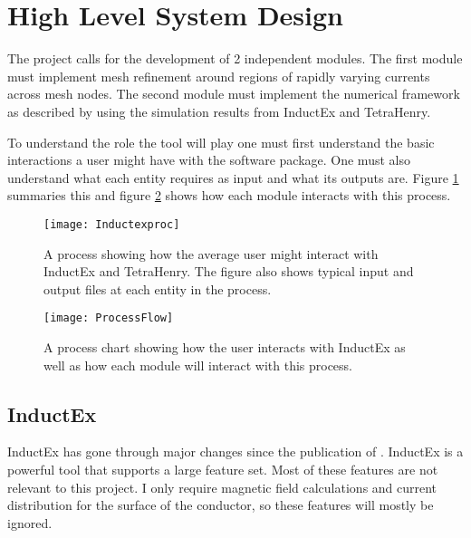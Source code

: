 \section{High Level System Design}
\label{chap:high level design}
The project calls for the development of 2 independent modules. The first module must implement mesh refinement around regions of rapidly varying currents across mesh nodes. The second module must implement the numerical framework as described by \cite{fluxNoiseSquidsStevenAnton} using the simulation results from InductEx and TetraHenry. \par
To understand the role the tool will play one must first understand the basic interactions a user might have with the software package. One must also understand what each entity requires as input and what its outputs are. Figure \ref{fig:Inductexproc} summaries this and figure \ref{fig:ProcessFlow} shows how each module interacts with this process.
\begin{figure}[h]
    \centering
    \texttt{[image: Inductexproc]}
    \caption{A process showing how the average user might interact with InductEx and TetraHenry. The figure also shows typical input and output files at each entity in the process.}
    \label{fig:Inductexproc}
\end{figure}
\begin{figure}[h]
    \centering
    \texttt{[image: ProcessFlow]}
    \caption{A process chart showing how the user interacts with InductEx as well as how each module will interact with this process.}
    \label{fig:ProcessFlow}
\end{figure}

\subsection{InductEx}
InductEx has gone through major changes since the publication of \cite{fluxNoiseSquidsStevenAnton}. InductEx is a powerful tool that supports a large feature set. Most of these features are not relevant to this project. I only require magnetic field calculations and current distribution for the surface of the conductor, so these features will mostly be ignored.

